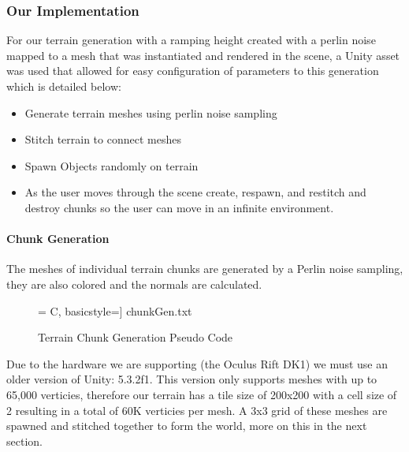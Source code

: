 \documentclass[a4paper,10pt]{article}
\begin{document}
\pagebreak
\subsubsection{Our Implementation}
For our terrain generation with a ramping height created with a perlin noise mapped to a mesh that was instantiated and rendered in the scene, a Unity asset was used that allowed for easy configuration of parameters to this generation which is detailed below:~\\
\begin{itemize}
\item Generate terrain meshes using perlin noise sampling
\item Stitch terrain to connect meshes
\item Spawn Objects randomly on terrain
\item As the user moves through the scene create, respawn, and restitch and destroy chunks so the user can move in an infinite environment.
\end{itemize}


\paragraph{Chunk Generation} 
The meshes of individual terrain chunks are generated by a Perlin noise sampling, they are also colored and the normals are calculated. 

\begin{figure}[H]
	 = C, basicstyle=\small] {chunkGen.txt}
	\caption{Terrain Chunk Generation Pseudo Code}
	\label{fig:TerrainChunkCode}
\end{figure}
Due to the hardware we are supporting (the Oculus Rift DK1) we must use an older version of Unity: 5.3.2f1. This version only supports meshes with up to 65,000 verticies, therefore our terrain has a tile size of 200x200 with a cell size of 2 resulting in a total of 60K verticies per mesh. A 3x3 grid of these meshes are spawned and stitched together to form the world, more on this in the next section.

\pagebreak
\end{document}
